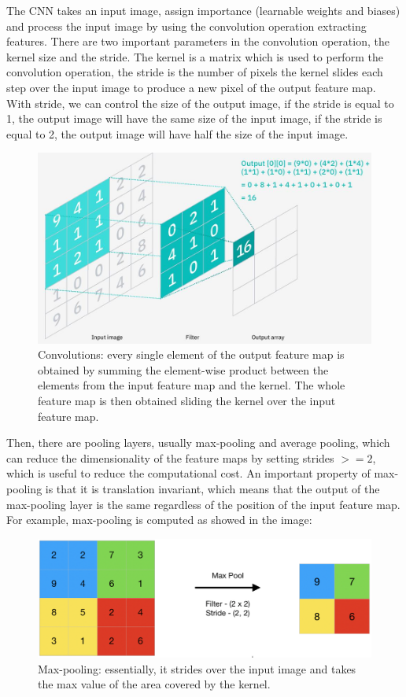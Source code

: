 The CNN takes an input image, assign importance (learnable weights and biases) and process the input image by using the convolution operation extracting features.
There are two important parameters in the convolution operation, the kernel size and the stride.
The kernel is a matrix which is used to perform the convolution operation, the stride is the number of pixels the kernel slides each step over the input image to produce a new pixel of the output feature map.
With stride, we can control the size of the output image, if the stride is equal to 1, the output image will have the same size of the input image, if the stride is equal to 2, the output image will have half the size of the input image.
\begin{figure}[H]
    \centering
    \includegraphics[width=\textwidth]{images/2_convolutions}
    \caption[Example of convolution]{Convolutions: every single element of the output feature map is obtained by summing the element-wise product between the elements from the input feature map and the kernel. The whole feature map is then obtained sliding the kernel over the input feature map.}
    \label{fig:figure-convolutions}
\end{figure}
Then, there are pooling layers, usually max-pooling and average pooling, which can reduce the dimensionality of the feature maps by setting strides $>=2$, which is useful to reduce the computational cost.
An important property of max-pooling is that it is translation invariant, which means that the output of the max-pooling layer is the same regardless of the position of the input feature map.
For example, max-pooling is computed as showed in the image:
\begin{figure}[H]
    \centering
    \includegraphics[width=\textwidth]{images/2_max_pooling}
    \caption[Example of max-pooling]{Max-pooling: essentially, it strides over the input image and takes the max value of the area covered by the kernel.}
    \label{fig:figure-max-pooling}
\end{figure}
